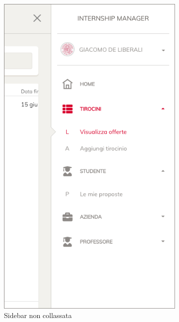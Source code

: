 \begin{figure}[H]
	\centering
	\begin{subfigure}[b]{0.4\textwidth}
		\includegraphics[width=1\textwidth]{Chapter2/Figs/xs-open}     
		\caption{Sidebar non collassata}
		\label{fig:screenshot:13} 
	\end{subfigure}        
	\hfil
	\begin{subfigure}[b]{0.4\textwidth}

\end{subfigure}
\end{figure}
